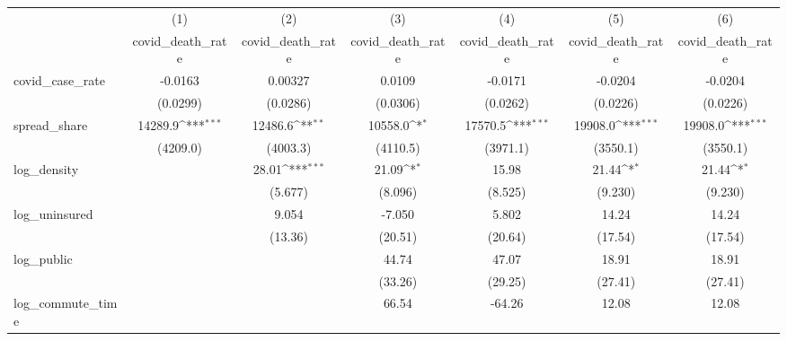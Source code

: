 {
\def\sym#1{\ifmmode^{#1}\else\(^{#1}\)\fi}
\begin{tabular}{l*{6}{c}}
\hline\hline
            &\multicolumn{1}{c}{(1)}&\multicolumn{1}{c}{(2)}&\multicolumn{1}{c}{(3)}&\multicolumn{1}{c}{(4)}&\multicolumn{1}{c}{(5)}&\multicolumn{1}{c}{(6)}\\
            &\multicolumn{1}{c}{covid\_death\_rate}&\multicolumn{1}{c}{covid\_death\_rate}&\multicolumn{1}{c}{covid\_death\_rate}&\multicolumn{1}{c}{covid\_death\_rate}&\multicolumn{1}{c}{covid\_death\_rate}&\multicolumn{1}{c}{covid\_death\_rate}\\
\hline
covid\_case\_rate&     -0.0163         &     0.00327         &      0.0109         &     -0.0171         &     -0.0204         &     -0.0204         \\
            &    (0.0299)         &    (0.0286)         &    (0.0306)         &    (0.0262)         &    (0.0226)         &    (0.0226)         \\
[1em]
spread\_share&     14289.9\sym{***}&     12486.6\sym{**} &     10558.0\sym{*}  &     17570.5\sym{***}&     19908.0\sym{***}&     19908.0\sym{***}\\
            &    (4209.0)         &    (4003.3)         &    (4110.5)         &    (3971.1)         &    (3550.1)         &    (3550.1)         \\
[1em]
log\_density &                     &       28.01\sym{***}&       21.09\sym{*}  &       15.98         &       21.44\sym{*}  &       21.44\sym{*}  \\
            &                     &     (5.677)         &     (8.096)         &     (8.525)         &     (9.230)         &     (9.230)         \\
[1em]
log\_uninsured&                     &       9.054         &      -7.050         &       5.802         &       14.24         &       14.24         \\
            &                     &     (13.36)         &     (20.51)         &     (20.64)         &     (17.54)         &     (17.54)         \\
[1em]
log\_public  &                     &                     &       44.74         &       47.07         &       18.91         &       18.91         \\
            &                     &                     &     (33.26)         &     (29.25)         &     (27.41)         &     (27.41)         \\
[1em]
log\_commute\_time&                     &                     &       66.54         &      -64.26         &       12.08         &       12.08         \\

\end{tabular}}
